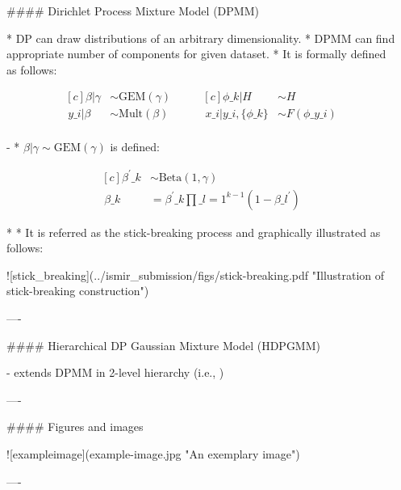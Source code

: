 \documentclass{beamer}
\begin{document}
\begin{frame}[fragile]
\begin{columns}[T]
\begin{column}{.46\textwidth}
\begin{markdown}
#### Dirichlet Process Mixture Model (DPMM)

* DP can draw distributions of an arbitrary dimensionality.
* DPMM can find appropriate number of components for given dataset.
* It is formally defined as follows:

\begin{equation}
\begin{aligned}[c]
    \beta|\gamma &\sim \text{GEM}(\gamma) \\\
    y\_{i}|\beta &\sim \text{Mult}(\beta) \\\
\end{aligned}
\qquad
\begin{aligned}[c]
    \phi\_{k}|H &\sim H \\\
    x\_{i}|y\_{i},\{\phi\_{k}\} &\sim F(\phi\_{y\_{i}}) \\\
\end{aligned}
\end{equation}

- 
* $\beta|\gamma \sim \text{GEM}(\gamma)$ is defined:

\begin{equation}
\begin{aligned}[c]
    \beta^{\prime}\_{k} &\sim \text{Beta}(1, \gamma) \\\
    \beta\_{k} &= \beta^{\prime}\_{k} \prod\_{l=1}^{k-1} (1 - \beta\_{l}^{\prime})
\end{aligned}
\end{equation}

*
* It is referred as the stick-breaking process and graphically illustrated as follows:

![stick_breaking](../ismir_submission/figs/stick-breaking.pdf "Illustration of stick-breaking construction")

----

#### Hierarchical DP Gaussian Mixture Model (HDPGMM)

- extends DPMM in 2-level hierarchy (i.e., )


---- 

#### Figures and images


![exampleimage](example-image.jpg "An exemplary image")

----

\end{markdown}

\end{column}

\begin{column}{.46\textwidth}


\end{column}
\end{columns}
\end{frame}
\end{document}
